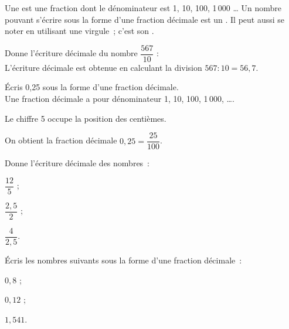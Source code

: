 \begin{aconnaitre}
Une  est une fraction dont le dénominateur est 1, 10, 100, 1\,000 \ldots
Un nombre pouvant s'écrire sous la forme d'une fraction décimale est un . Il peut aussi se noter en utilisant une virgule ; c'est son .
\end{aconnaitre}

\begin{methode*1}

\begin{exemple*1}
Donne l'écriture décimale du nombre $\dfrac{567}{10}$ :\\[0.5em]
L'écriture décimale est obtenue en calculant la division $567 : 10 = 56,7$.
 \end{exemple*1}
 
\begin{exemple*1}
Écris 0,25 sous la forme d'une fraction décimale. \\[0.5em]
Une fraction décimale a pour dénominateur 1, 10, 100, 1\,000, \ldots .

Le chiffre 5 occupe la position des centièmes.

On obtient la fraction décimale $0,25 = \dfrac{25}{100}$.
 \end{exemple*1}
 
  \exercice
Donne l'écriture décimale des nombres :
\vspace{.8em}
\begin{colenumerate}{3}
 \item $\dfrac{12}{5}$ \dotfill;
 \item $\dfrac{2,5}{2}$ \dotfill;
 \item $\dfrac{4}{2,5}$\dotfill.
 \end{colenumerate}

  \exercice
Écris les nombres suivants sous la forme d'une fraction décimale :
\vspace{.8em}
\begin{colenumerate}{3}
 \item $0,8$ \dotfill;
 \item $0,12$ \dotfill;
 \item $1,541$\dotfill.
 \end{colenumerate}

 \end{methode*1}


